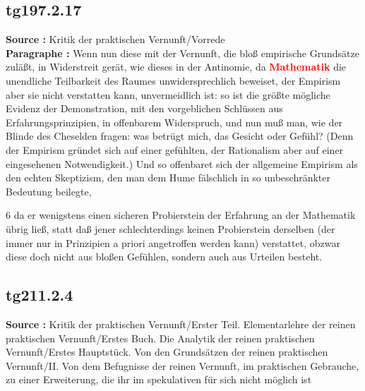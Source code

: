 \documentclass[a4paper,12pt,twoside]{book}
\newcommand{\match}[1]{\textcolor{red}{\textbf{#1}}}
\begin{document}
	\subsection*{tg197.2.17} 
	\textbf{Source : }Kritik der praktischen Vernunft/Vorrede\\  
	
	\textbf{Paragraphe : }
	Wenn nun diese mit der Vernunft, die bloß empirische Grundsätze zuläßt, in Widerstreit gerät, wie dieses in der Antinomie, da \match{Mathematik} die unendliche Teilbarkeit des Raumes unwidersprechlich beweiset, der Empirism aber sie nicht verstatten kann, unvermeidlich ist: so ist die größte mögliche Evidenz der Demonstration, mit den vorgeblichen Schlüssen aus Erfahrungsprinzipien, in offenbarem Widerspruch, und nun muß man, wie der Blinde des Cheselden fragen: was betrügt mich, das Gesicht oder Gefühl? (Denn der Empirism gründet sich auf einer gefühlten, der Rationalism aber auf einer eingesehenen Notwendigkeit.) Und so offenbaret sich der allgemeine Empirism als den echten Skeptizism, den man dem Hume fälschlich in so unbeschränkter Bedeutung beilegte,
	
	
	6
	da er wenigstens einen sicheren Probierstein der Erfahrung an der Mathematik übrig ließ, statt daß jener schlechterdings keinen Probierstein derselben (der immer nur in Prinzipien a priori angetroffen werden kann) verstattet, obzwar diese doch nicht aus bloßen Gefühlen, sondern auch aus Urteilen besteht. 
	
	\subsection*{tg211.2.4} 
	\textbf{Source : }Kritik der praktischen Vernunft/Erster Teil. Elementarlehre der reinen praktischen Vernunft/Erstes Buch. Die Analytik der reinen praktischen Vernunft/Erstes Hauptstück. Von den Grundsätzen der reinen praktischen Vernunft/II. Von dem Befugnisse der reinen Vernunft, im praktischen Gebrauche, zu einer Erweiterung, die ihr im spekulativen für sich nicht möglich ist\\  
	
\end{document}
